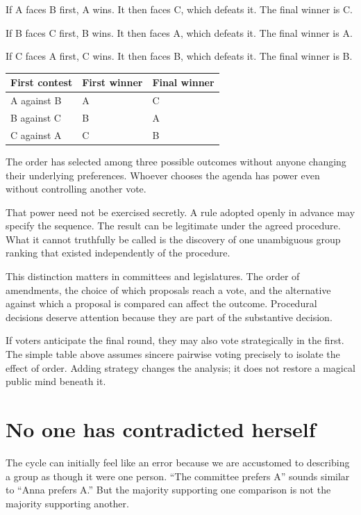 \documentclass[12pt,a4paper]{book}
\begin{document}
If A faces B first, A wins. It then faces C, which defeats it. The final winner is C.

If B faces C first, B wins. It then faces A, which defeats it. The final winner is A.

If C faces A first, C wins. It then faces B, which defeats it. The final winner is B.

\begin{center}
\begin{tabular}{lll}
\toprule
First contest & First winner & Final winner \\
\midrule
A against B & A & C \\
B against C & B & A \\
C against A & C & B \\
\bottomrule
\end{tabular}
\end{center}

The order has selected among three possible outcomes without anyone changing their underlying preferences. Whoever chooses the agenda has power even without controlling another vote.

That power need not be exercised secretly. A rule adopted openly in advance may specify the sequence. The result can be legitimate under the agreed procedure. What it cannot truthfully be called is the discovery of one unambiguous group ranking that existed independently of the procedure.

This distinction matters in committees and legislatures. The order of amendments, the choice of which proposals reach a vote, and the alternative against which a proposal is compared can affect the outcome. Procedural decisions deserve attention because they are part of the substantive decision.

If voters anticipate the final round, they may also vote strategically in the first. The simple table above assumes sincere pairwise voting precisely to isolate the effect of order. Adding strategy changes the analysis; it does not restore a magical public mind beneath it.

\section*{No one has contradicted herself}

The cycle can initially feel like an error because we are accustomed to describing a group as though it were one person. ``The committee prefers A'' sounds similar to ``Anna prefers A.'' But the majority supporting one comparison is not the majority supporting another.
\end{document}
